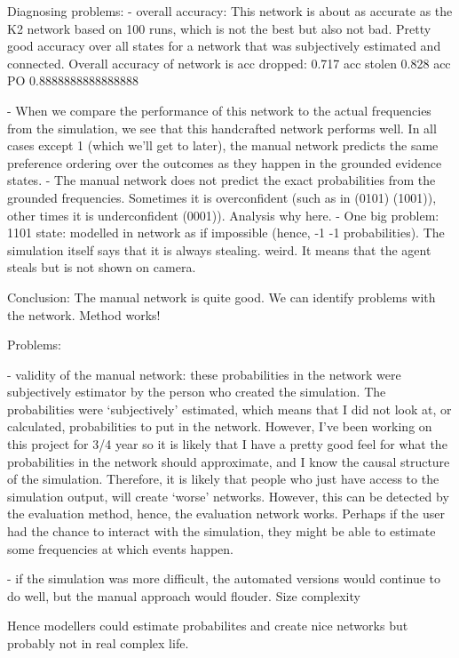 \documentclass[12pt]{article}
\begin{document}
\newpage


Diagnosing problems:
- overall accuracy: This network is about as accurate as the K2 network based on 100 runs, which is not the best but also not bad. Pretty good accuracy over all states for a network that was subjectively estimated and connected. Overall accuracy of network is 
acc dropped:  0.717
acc stolen 0.828
acc PO 0.8888888888888888

- When we compare the performance of this network to the actual frequencies from the simulation, we see that this handcrafted network performs well. In all cases except 1 (which we'll get to later), the manual network  predicts the same preference ordering over the outcomes as they happen in the grounded evidence states.
- The manual network does not predict the exact probabilities from the grounded frequencies. Sometimes it is overconfident (such as in (0101) (1001)), other times it is underconfident (0001)). Analysis why here.
- One big problem: 1101 state: modelled in network as if impossible (hence, -1 -1 probabilities). The simulation itself says that it is always stealing. weird. It means that the agent steals but is not shown on camera.

Conclusion:
The manual network is quite good. We can identify problems with the network. Method works! 
 

Problems:

-  validity of the manual network: these probabilities in the network were subjectively estimator by the person who created the simulation. The probabilities were `subjectively' estimated, which means that I did not look at, or calculated, probabilities to put in the network. However, I've been working on this project for 3/4 year so it is likely that I have a pretty good feel for what the probabilities in the network should approximate, and I know the causal structure of the simulation. Therefore, it is likely that people who just have access to the simulation output, will create `worse' networks. However, this can be detected by the evaluation method, hence, the evaluation network works. Perhaps if the user had the chance to interact with the simulation, they might be able to estimate some frequencies at which events happen. 

- if the simulation was more difficult, the automated versions would continue to do well, but the manual approach would flouder. Size complexity

Hence modellers could estimate probabilites and create nice networks but probably not in real complex life.
\end{document}
